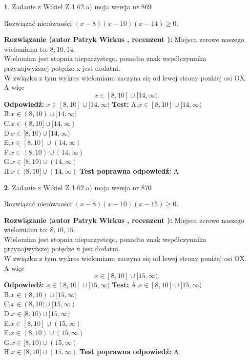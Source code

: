 \documentclass[12pt, a4paper]{article}
\theoremstyle{definition} %
\newtheorem{zad}{}
\newcommand{\zadStart}[1]{\begin{zad}#1\newline}
\newcommand{\zadStop}{\end{zad}}
\newcommand{\rozwStart}[2]{\noindent \textbf{Rozwiązanie (autor #1 , recenzent #2): }\newline}
\newcommand{\rozwStop}{\newline}
\newcommand{\odpStart}{\noindent \textbf{Odpowiedź:}\newline}
\newcommand{\odpStop}{\newline}
\newcommand{\testStart}{\noindent \textbf{Test:}\newline}
\newcommand{\testStop}{\newline}
\newcommand{\kluczStart}{\noindent \textbf{Test poprawna odpowiedź:}\newline}
\newcommand{\kluczStop}{\newline}
\begin{document}
\zadStart{Zadanie z Wikieł Z 1.62 a) moja wersja nr 869}

Rozwiązać nierówności $(x-8)(x-10)(x-14)\ge0$.
\zadStop
\rozwStart{Patryk Wirkus}{}
Miejsca zerowe naszego wielomianu to: $8, 10, 14$.\\
Wielomian jest stopnia nieparzystego, ponadto znak współczynnika przy\linebreak najwyższej potędze x jest dodatni.\\ W związku z tym wykres wielomianu zaczyna się od lewej strony poniżej osi OX. A więc $$x \in [8,10] \cup [14,\infty).$$
\rozwStop
\odpStart
$x \in [8,10] \cup [14,\infty)$
\odpStop
\testStart
A.$x \in [8,10] \cup [14,\infty)$\\
B.$x \in (8,10) \cup [14,\infty)$\\
C.$x \in (8,10] \cup [14,\infty)$\\
D.$x \in [8,10) \cup [14,\infty)$\\
E.$x \in [8,10] \cup (14,\infty)$\\
F.$x \in (8,10) \cup (14,\infty)$\\
G.$x \in [8,10) \cup (14,\infty)$\\
H.$x \in (8,10] \cup (14,\infty)$
\testStop
\kluczStart
A
\kluczStop



\zadStart{Zadanie z Wikieł Z 1.62 a) moja wersja nr 870}

Rozwiązać nierówności $(x-8)(x-10)(x-15)\ge0$.
\zadStop
\rozwStart{Patryk Wirkus}{}
Miejsca zerowe naszego wielomianu to: $8, 10, 15$.\\
Wielomian jest stopnia nieparzystego, ponadto znak współczynnika przy\linebreak najwyższej potędze x jest dodatni.\\ W związku z tym wykres wielomianu zaczyna się od lewej strony poniżej osi OX. A więc $$x \in [8,10] \cup [15,\infty).$$
\rozwStop
\odpStart
$x \in [8,10] \cup [15,\infty)$
\odpStop
\testStart
A.$x \in [8,10] \cup [15,\infty)$\\
B.$x \in (8,10) \cup [15,\infty)$\\
C.$x \in (8,10] \cup [15,\infty)$\\
D.$x \in [8,10) \cup [15,\infty)$\\
E.$x \in [8,10] \cup (15,\infty)$\\
F.$x \in (8,10) \cup (15,\infty)$\\
G.$x \in [8,10) \cup (15,\infty)$\\
H.$x \in (8,10] \cup (15,\infty)$
\testStop
\kluczStart
A
\kluczStop
\end{document}
